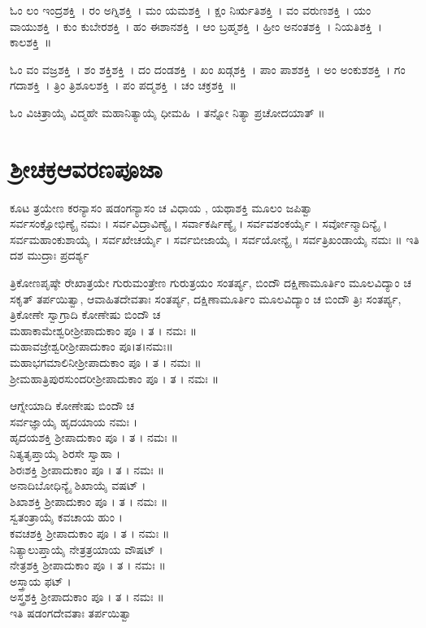 ಓಂ ಲಂ ಇಂದ್ರಶಕ್ತಿ~।  ರಂ ಅಗ್ನಿಶಕ್ತಿ~।  ಮಂ ಯಮಶಕ್ತಿ~।  ಕ್ಷಂ ನಿರ್ಋತಿಶಕ್ತಿ~।  ವಂ ವರುಣಶಕ್ತಿ~।  ಯಂ ವಾಯುಶಕ್ತಿ~।  ಕುಂ ಕುಬೇರಶಕ್ತಿ~।  ಹಂ ಈಶಾನಶಕ್ತಿ~।  ಆಂ ಬ್ರಹ್ಮಶಕ್ತಿ~।  ಹ್ರೀಂ ಅನಂತಶಕ್ತಿ~।  ನಿಯತಿಶಕ್ತಿ~।  ಕಾಲಶಕ್ತಿ~॥

ಓಂ ವಂ ವಜ್ರಶಕ್ತಿ~।  ಶಂ ಶಕ್ತಿಶಕ್ತಿ~।  ದಂ ದಂಡಶಕ್ತಿ~।  ಖಂ ಖಡ್ಗಶಕ್ತಿ~।  ಪಾಂ ಪಾಶಶಕ್ತಿ~।  ಅಂ ಅಂಕುಶಶಕ್ತಿ~।  ಗಂ ಗದಾಶಕ್ತಿ~।  ತ್ರಿಂ ತ್ರಿಶೂಲಶಕ್ತಿ~।  ಪಂ ಪದ್ಮಶಕ್ತಿ~।  ಚಂ ಚಕ್ರಶಕ್ತಿ~॥

ಓಂ ವಿಚಿತ್ರಾಯೈ ವಿದ್ಮಹೇ ಮಹಾನಿತ್ಯಾಯೈ ಧೀಮಹಿ~। ತನ್ನೋ ನಿತ್ಯಾ ಪ್ರಚೋದಯಾತ್ ॥
\newpage


\section{ಶ್ರೀಚಕ್ರಆವರಣಪೂಜಾ}
ಕೂಟ ತ್ರಯೇಣ ಕರನ್ಯಾಸಂ ಷಡಂಗನ್ಯಾಸಂ ಚ ವಿಧಾಯ , ಯಥಾಶಕ್ತಿ ಮೂಲಂ ಜಪಿತ್ವಾ\\
 ಸರ್ವಸಂಕ್ಷೋಭಿಣ್ಯೈ ನಮಃ ।  ಸರ್ವವಿದ್ರಾವಿಣ್ಯೈ ।  ಸರ್ವಾಕರ್ಷಿಣ್ಯೈ ।  ಸರ್ವವಶಂಕರ್ಯೈ ।  ಸರ್ವೋನ್ಮಾದಿನ್ಯೈ ।  ಸರ್ವಮಹಾಂಕುಶಾಯೈ ।  ಸರ್ವಖೇಚರ್ಯೈ ।  ಸರ್ವಬೀಜಾಯೈ ।  ಸರ್ವಯೋನ್ಯೈ ।  ಸರ್ವತ್ರಿಖಂಡಾಯೈ ನಮಃ ॥ ಇತಿ ದಶ ಮುದ್ರಾಃ ಪ್ರದರ್ಶ್ಯ

 ತ್ರಿಕೋಣಪೃಷ್ಠೇ ರೇಖಾತ್ರಯೇ ಗುರುಮಂತ್ರೇಣ ಗುರುತ್ರಯಂ ಸಂತರ್ಪ್ಯ, ಬಿಂದೌ ದಕ್ಷಿಣಾಮೂರ್ತಿಂ ಮೂಲವಿದ್ಯಾಂ ಚ ಸಕೃತ್ ತರ್ಪಯಿತ್ವಾ, ಆವಾಹಿತದೇವತಾಃ ಸಂತರ್ಪ್ಯ, ದಕ್ಷಿಣಾಮೂರ್ತಿಂ ಮೂಲವಿದ್ಯಾಂ ಚ ಬಿಂದೌ  ತ್ರಿಃ ಸಂತರ್ಪ್ಯ, ತ್ರಿಕೋಣೇ ಸ್ವಾಗ್ರಾದಿ ಕೋಣೇಷು ಬಿಂದೌ ಚ\\
 ಮಹಾಕಾಮೇಶ್ವರೀಶ್ರೀಪಾದುಕಾಂ ಪೂ । ತ । ನಮಃ ॥\\
 ಮಹಾವಜ್ರೇಶ್ವರೀಶ್ರೀಪಾದುಕಾಂ ಪೂ।ತ।ನಮಃ॥\\
 ಮಹಾಭಗಮಾಲಿನೀಶ್ರೀಪಾದುಕಾಂ ಪೂ । ತ । ನಮಃ ॥\\
 ಶ್ರೀಮಹಾತ್ರಿಪುರಸುಂದರೀಶ್ರೀಪಾದುಕಾಂ  ಪೂ । ತ । ನಮಃ ॥

ಆಗ್ನೇಯಾದಿ ಕೋಣೇಷು ಬಿಂದೌ ಚ \\
 ಸರ್ವಜ್ಞಾಯೈ ಹೃದಯಾಯ ನಮಃ ।\\ ಹೃದಯಶಕ್ತಿ ಶ್ರೀಪಾದುಕಾಂ ಪೂ । ತ । ನಮಃ ॥\\
 ನಿತ್ಯತೃಪ್ತಾಯೈ ಶಿರಸೇ ಸ್ವಾಹಾ । \\ಶಿರಃಶಕ್ತಿ ಶ್ರೀಪಾದುಕಾಂ ಪೂ । ತ । ನಮಃ ॥\\
 ಅನಾದಿಬೋಧಿನ್ಯೈ ಶಿಖಾಯೈ ವಷಟ್ ।\\ ಶಿಖಾಶಕ್ತಿ ಶ್ರೀಪಾದುಕಾಂ ಪೂ । ತ । ನಮಃ ॥\\
 ಸ್ವತಂತ್ರಾಯೈ ಕವಚಾಯ ಹುಂ । \\ಕವಚಶಕ್ತಿ ಶ್ರೀಪಾದುಕಾಂ ಪೂ । ತ । ನಮಃ ॥\\
 ನಿತ್ಯಾಲುಪ್ತಾಯೈ ನೇತ್ರತ್ರಯಾಯ ವೌಷಟ್ । \\ನೇತ್ರಶಕ್ತಿ ಶ್ರೀಪಾದುಕಾಂ ಪೂ । ತ । ನಮಃ ॥\\
 ಅಸ್ತ್ರಾಯ ಫಟ್ ।\\ ಅಸ್ತ್ರಶಕ್ತಿ ಶ್ರೀಪಾದುಕಾಂ ಪೂ । ತ । ನಮಃ ॥\\
ಇತಿ ಷಡಂಗದೇವತಾಃ ತರ್ಪಯಿತ್ವಾ\\


